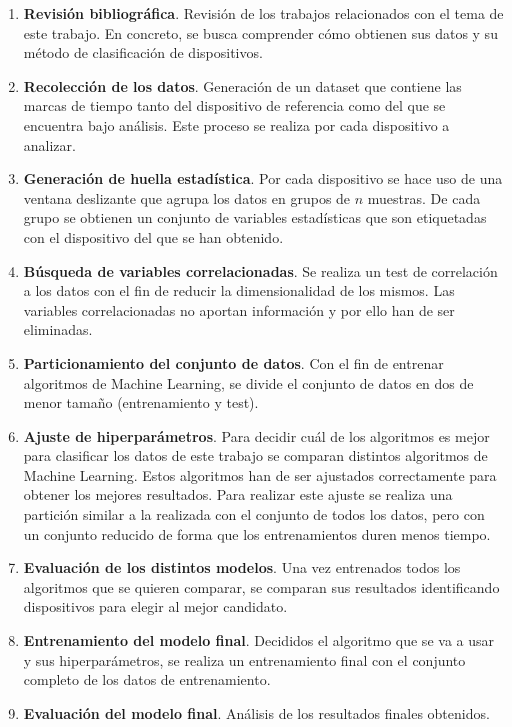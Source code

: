 \begin{enumerate}
    \item \textbf{Revisión bibliográfica}. Revisión de los trabajos relacionados con el tema de este trabajo. En concreto, se busca comprender cómo obtienen sus datos y su método de clasificación de dispositivos.
    \item \textbf{Recolección de los datos}. Generación de un dataset que contiene las marcas de tiempo tanto del dispositivo de referencia como del que se encuentra bajo análisis. Este proceso se realiza por cada dispositivo a analizar.
    \item \textbf{Generación de huella estadística}. Por cada dispositivo se hace uso de una ventana deslizante que agrupa los datos en grupos de $n$ muestras. De cada grupo se obtienen un conjunto de variables estadísticas que son etiquetadas con el dispositivo del que se han obtenido.
    \item \textbf{Búsqueda de variables correlacionadas}. Se realiza un test de correlación a los datos con el fin de reducir la dimensionalidad de los mismos. Las variables correlacionadas no aportan información y por ello han de ser eliminadas.
    \item \textbf{Particionamiento del conjunto de datos}. Con el fin de entrenar algoritmos de Machine Learning, se divide el conjunto de datos en dos de menor tamaño (entrenamiento y test).
    \item \textbf{Ajuste de hiperparámetros}. Para decidir cuál de los algoritmos es mejor para clasificar los datos de este trabajo se comparan distintos algoritmos de Machine Learning. Estos algoritmos han de ser ajustados correctamente para obtener los mejores resultados. Para realizar este ajuste se realiza una partición similar a la realizada con el conjunto de todos los datos, pero con un conjunto reducido de forma que los entrenamientos duren menos tiempo.
    \item \textbf{Evaluación de los distintos modelos}. Una vez entrenados todos los algoritmos que se quieren comparar, se comparan sus resultados identificando dispositivos para elegir al mejor candidato.
    \item \textbf{Entrenamiento del modelo final}. Decididos el algoritmo que se va a usar y sus hiperparámetros, se realiza un entrenamiento final con el conjunto completo de los datos de entrenamiento.
    \item \textbf{Evaluación del modelo final}. Análisis de los resultados finales obtenidos.
\end{enumerate}
